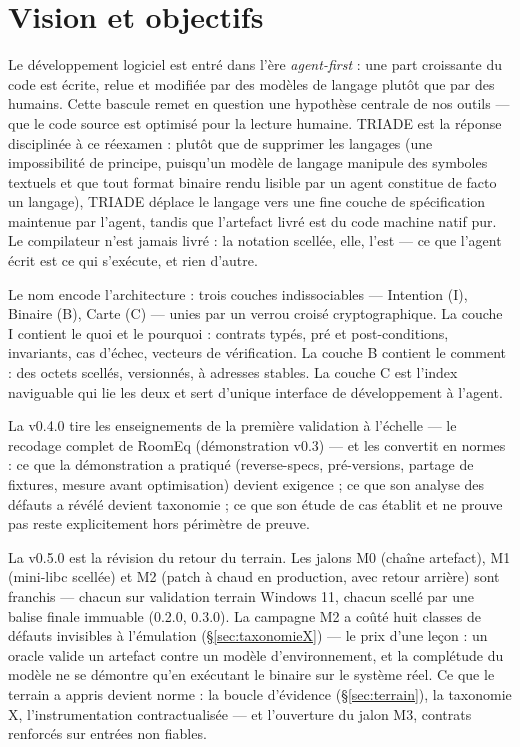 \section{Vision et objectifs}\label{sec:vision}

Le développement logiciel est entré dans l’ère \emph{agent-first} : une part croissante du
code est écrite, relue et modifiée par des modèles de langage plutôt que par des humains.
Cette bascule remet en question une hypothèse centrale de nos outils — que le code source
est optimisé pour la lecture humaine. TRIADE est la réponse disciplinée à ce réexamen :
plutôt que de supprimer les langages (une impossibilité de principe, puisqu’un modèle de
langage manipule des symboles textuels et que tout format binaire rendu lisible par un
agent constitue de facto un langage), TRIADE déplace le langage vers une fine couche de
spécification maintenue par l’agent, tandis que l’artefact livré est du code machine natif
pur. Le compilateur n’est jamais livré : la notation scellée, elle, l’est — ce que
l’agent écrit est ce qui s’exécute, et rien d’autre.

Le nom encode l’architecture : trois couches indissociables — Intention (I), Binaire (B),
Carte (C) — unies par un verrou croisé cryptographique. La couche I contient le quoi et le
pourquoi : contrats typés, pré et post-conditions, invariants, cas d’échec, vecteurs de
vérification. La couche B contient le comment : des octets scellés, versionnés, à adresses
stables. La couche C est l’index naviguable qui lie les deux et sert d’unique interface de
développement à l’agent.

La v0.4.0 tire les enseignements de la première validation à l’échelle — le recodage
complet de RoomEq (démonstration v0.3) — et les convertit en normes : ce que la
démonstration a pratiqué (reverse-specs, pré-versions, partage de fixtures, mesure avant
optimisation) devient exigence ; ce que son analyse des défauts a révélé devient
taxonomie ; ce que son étude de cas établit et ne prouve pas reste explicitement hors
périmètre de preuve.

La v0.5.0 est la révision du retour du terrain. Les jalons M0 (chaîne artefact), M1
(mini-libc scellée) et M2 (patch à chaud en production, avec retour arrière) sont
franchis — chacun sur validation terrain Windows 11, chacun scellé par une balise
finale immuable (0.2.0, 0.3.0). La campagne M2 a coûté huit classes de défauts
invisibles à l’émulation (§\ref{sec:taxonomieX}) — le prix d’une leçon : un oracle
valide un artefact contre un modèle d’environnement, et la complétude du modèle ne se
démontre qu’en exécutant le binaire sur le système réel. Ce que le terrain a appris
devient norme : la boucle d’évidence (§\ref{sec:terrain}), la taxonomie X,
l’instrumentation contractualisée — et l’ouverture du jalon M3, contrats renforcés
sur entrées non fiables.

